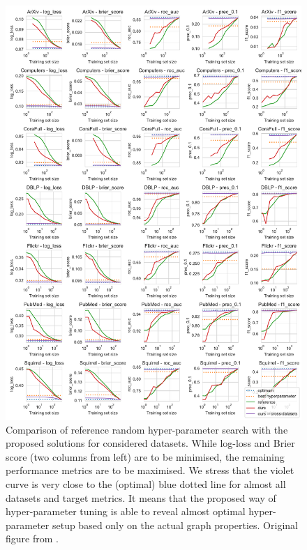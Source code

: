 \begin{figure}
	\includegraphics[width=\linewidth]{images/gnn-hpo.pdf}
	\caption{Comparison of reference random hyper-parameter search with the proposed solutions for considered datasets. While log-loss and Brier score (two columns from left) are to be minimised, the remaining performance metrics are to be maximised. We stress that the violet curve is very close to the (optimal) blue dotted line for almost all datasets and target metrics. It means that the proposed way of hyper-parameter tuning is able to reveal almost optimal hyper-parameter setup based only on the actual graph properties. Original figure from \cite{prochazka_which_2023}.}
	\label{fig:gnn-hpo}
\end{figure}

